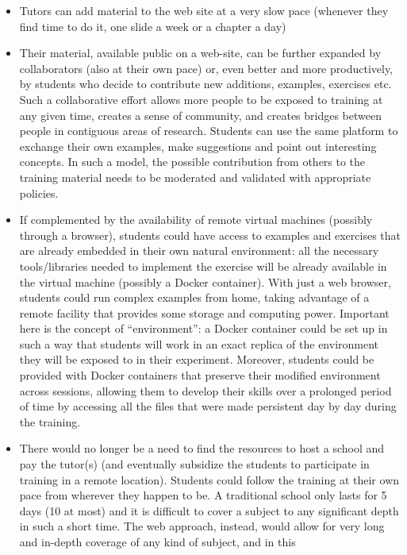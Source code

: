 \documentclass[12pt,a4paper]{article}
\begin{document}
\begin{itemize}
   \item Tutors can add material to the web site at a very slow pace (whenever
   they find time to do it, one slide a week or a chapter a day) 
   \item Their material, available public on a web-site, can be further expanded
   by collaborators (also at their own pace) or, even better and more productively, by students
   who decide to contribute new additions, examples, exercises etc. Such a
   collaborative effort allows more people to be exposed to training at any
   given time, creates a sense of community, and creates bridges between people
   in contiguous areas of research. Students can use the same platform to
   exchange their own examples, make suggestions and point out interesting
   concepts. In such a model, the possible contribution from others to the
   training material needs to be moderated and validated with appropriate
   policies.
   \item If complemented by the availability of remote virtual machines
   (possibly through a browser), students could have access to examples and
   exercises that are already embedded in their own natural environment: all the
   necessary tools/libraries needed to implement the exercise will be already
   available in the virtual machine (possibly a Docker container). With just a
   web browser, students could run complex examples from home, taking advantage
   of a remote facility that provides some storage and computing power.
   Important here is the concept of ``environment'': a Docker container could be
   set up in such a way that students will work in an exact replica of the
   environment they will be exposed to in their experiment. Moreover, students 
   could be provided with Docker containers that
   preserve their modified environment across sessions, allowing them to
   develop their skills over a prolonged period of time by accessing all the
   files that were made persistent day by day during the training.
   \item There would no longer be a need to find the resources to host a school
   and pay the tutor(s) (and eventually subsidize the students to participate in
   training in a remote location). Students could follow the training at their
   own pace from wherever they happen to be. A traditional school only lasts for
   5 days (10 at most) and it is difficult to cover a  subject to any
   significant depth in such a short time. The web approach, instead, would
   allow for very long and in-depth coverage of any kind of subject, and in this

\end{itemize}
\end{document}
